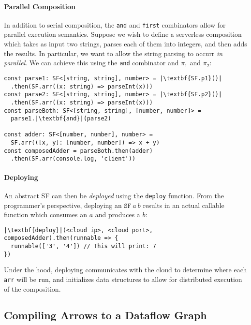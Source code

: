 \documentclass[10pt,sigplan,screen,nonacm]{acmart}
\begin{document}
\paragraph{Parallel Composition}
In addition to serial composition, the \texttt{and} and \texttt{first}
combinators allow for parallel execution semantics. Suppose we wish to define
a serverless composition which takes as input two strings,
parses each of them into integers, and then adds the results.
In particular, we want to allow the string parsing to occurr
\emph{in parallel}.
We can achieve this using the \texttt{and} combinator and $\pi_1$ and $\pi_2$:

\begin{verbatim}
const parse1: SF<[string, string], number> = |\textbf{SF.p1}()|
  .then(SF.arr((x: string) => parseInt(x)))
const parse2: SF<[string, string], number> = |\textbf{SF.p2}()|
  .then(SF.arr((x: string) => parseInt(x)))
const parseBoth: SF<[string, string], [number, number]> = 
  parse1.|\textbf{and}|(parse2)

const adder: SF<[number, number], number> = 
  SF.arr(([x, y]: [number, number]) => x + y)
const composedAdder = parseBoth.then(adder)
  .then(SF.arr(console.log, 'client'))
\end{verbatim}


\paragraph{Deploying}
An abstract SF can then be \emph{deployed} using the \texttt{deploy}
function. From the programmer's perspective, deploying an $\texttt{SF}~a~b$ 
results in an actual callable function which consumes an $a$ and produces a $b$:

\begin{verbatim}
|\textbf{deploy}|(<cloud ip>, <cloud port>, composedAdder).then(runnable => {
  runnable(['3', '4']) // This will print: 7
})
\end{verbatim}

Under the hood, deploying communicates with the cloud to determine
where each \texttt{arr} will be run, and initializes data structures
to allow for distributed execution of the composition.


\subsection{Compiling Arrows to a Dataflow Graph}
\label{section:dag-compile}
\end{document}
